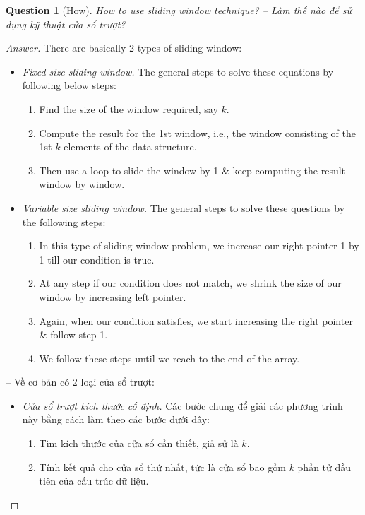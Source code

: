 \documentclass{article}
\newtheorem{question}{Question}
\begin{document}
\begin{question}[How]
    How to use sliding window technique? -- Làm thế nào để sử dụng kỹ thuật cửa sổ trượt?
\end{question}

\begin{proof}[Answer]
    There are basically 2 types of sliding window:
    \begin{itemize}
        \item {\it Fixed size sliding window.} The general steps to solve these equations by following below steps:
        \begin{enumerate}
            \item Find the size of the window required, say $k$.
            \item Compute the result for the 1st window, i.e., the window consisting of the 1st $k$ elements of the data structure.
            \item Then use a loop to slide the window by 1 \& keep computing the result window by window.
        \end{enumerate}
        \item {\it Variable size sliding window.} The general steps to solve these questions by the following steps:
        \begin{enumerate}
            \item In this type of sliding window problem, we increase our right pointer 1 by 1 till our condition is true.
            \item At any step if our condition does not match, we shrink the size of our window by increasing left pointer.
            \item Again, when our condition satisfies, we start increasing the right pointer \& follow step 1.
            \item We follow these steps until we reach to the end of the array.
        \end{enumerate}
    \end{itemize}
    -- Về cơ bản có 2 loại cửa sổ trượt:
    \begin{itemize}
        \item {\it Cửa sổ trượt kích thước cố định.} Các bước chung để giải các phương trình này bằng cách làm theo các bước dưới đây:
        \begin{enumerate}
            \item Tìm kích thước của cửa sổ cần thiết, giả sử là $k$.
            \item Tính kết quả cho cửa sổ thứ nhất, tức là cửa sổ bao gồm $k$ phần tử đầu tiên của cấu trúc dữ liệu.

\end{enumerate}
\end{itemize}
\end{proof}
\end{document}
